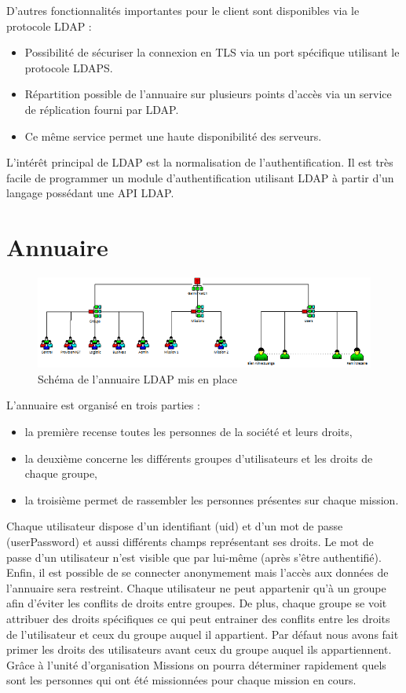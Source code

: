 \documentclass[11pt,fleqn]{report}
\begin{document}
D’autres fonctionnalités importantes pour le client sont disponibles via le protocole LDAP :
\begin{itemize}
\item Possibilité de sécuriser la connexion en TLS via un port spécifique utilisant le protocole LDAPS.
\item Répartition possible de l’annuaire sur plusieurs points d’accès via un service de réplication fourni par LDAP.
\item Ce même service permet une haute disponibilité des serveurs.
\end{itemize}

L'intérêt principal de LDAP est la normalisation de l'authentification. Il est très facile de programmer un module d'authentification utilisant LDAP à partir d'un langage possédant une API LDAP.
\chapter{Annuaire}
\begin{figure}[htbp]
	\centering
	\includegraphics[scale=0.9]{Images/SchemaLDAP.png}
	\caption{Schéma de l'annuaire LDAP mis en place}
	\label{SchemaLDAP}
\end{figure}
L’annuaire est organisé en trois parties :
\begin{itemize}
\item la première recense toutes les personnes de la société et leurs droits,
\item la deuxième concerne les différents groupes d’utilisateurs et les droits de chaque groupe,
\item la troisième permet de rassembler les personnes présentes sur chaque mission.
\end{itemize}
Chaque utilisateur dispose d’un identifiant (uid) et d’un mot de passe (userPassword) et aussi différents champs représentant ses droits. Le mot de passe d’un utilisateur n’est visible que par lui-même (après s’être authentifié). Enfin, il est possible de se connecter anonymement mais l’accès aux données de l’annuaire sera restreint.
Chaque utilisateur ne peut appartenir qu’à un groupe afin d’éviter les conflits de droits entre groupes. De plus, chaque groupe se voit attribuer des droits spécifiques ce qui peut entrainer des conflits entre les droits de l’utilisateur et ceux du groupe auquel il appartient. Par défaut nous avons fait primer les droits des utilisateurs avant ceux du groupe auquel ils appartiennent.
Grâce à l’unité d’organisation Missions on pourra déterminer rapidement quels sont les personnes qui ont été missionnées pour chaque mission en cours.
\end{document}

